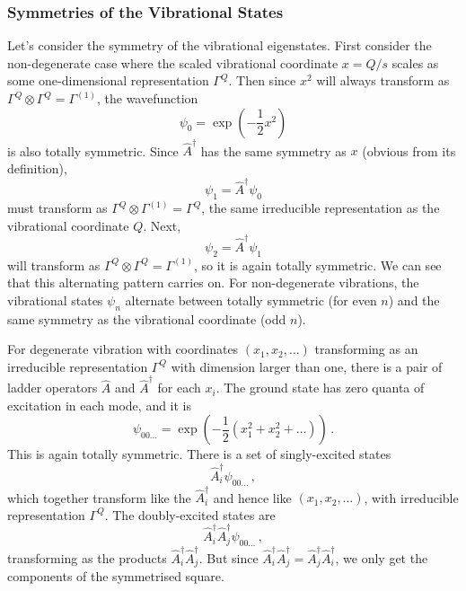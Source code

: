 \documentclass{article}
\theoremstyle{plain}\theoremheaderfont{\normalfont\itshape}\theorembodyfont{\rmfamily}\theoremseparator{.}\newtheorem*{rem}{Remark}\newtheorem*{ex}{Example}\newtheorem*{proof}{Proof}\newtheorem*{altp}{Alternative proof}
\theoremstyle{plain}\theoremheaderfont{\normalfont\bfseries}\theorembodyfont{\rmfamily}\theoremseparator{.}\newtheorem{thm}{Theorem}[section]\newtheorem{lem}[thm]{Lemma}\newtheorem{prop}[thm]{Proposition}\newtheorem*{cor}{Corollary}\newtheorem{defn}[thm]{Definition}\newtheorem{clm}[thm]{Claim}\newtheorem{clminproof}{Claim}\newtheorem*{law}{Law}\newtheorem{pos}[thm]{Postulate}
\theoremstyle{break}\theoremheaderfont{\normalfont\itshape}\theorembodyfont{\rmfamily}\theoremseparator{.\medskip}\newtheorem*{proofskip}{Proof}\newtheorem*{exs}{Examples}\newtheorem*{rems}{Remarks}
\theoremstyle{break}\theoremheaderfont{\normalfont\bfseries}\theorembodyfont{\rmfamily}\theoremseparator{.\medskip}\newtheorem{lemskip}[thm]{Lemma}\newtheorem{defnskip}[thm]{Definition}\newtheorem{propskip}[thm]{Proposition}\newtheorem{thmskip}[thm]{Theorem}
\numberwithin{equation}{section}
\begin{document}
    \subsubsection{Symmetries of the Vibrational States}
    Let's consider the symmetry of the vibrational eigenstates. First consider the non-degenerate case where the scaled vibrational coordinate \(x=Q/s\) scales as some one-dimensional representation \(\Gamma^Q\). Then since \(x^2\) will always transform as \(\Gamma^Q\otimes\Gamma^Q=\Gamma^{(1)}\), the wavefunction
    \begin{equation}
        \psi_0=\exp\left(-\frac{1}{2}x^2\right)
    \end{equation}
    is also totally symmetric. Since \(\hat{A}^\dagger\) has the same symmetry as \(x\) (obvious from its definition),
    \begin{equation}
        \psi_1=\hat{A}^\dagger\psi_0
    \end{equation}
    must transform as \(\Gamma^{Q}\otimes\Gamma^{(1)}=\Gamma^{Q}\), the same irreducible representation as the vibrational coordinate \(Q\). Next,
    \begin{equation}
        \psi_2=\hat{A}^\dagger\psi_1
    \end{equation}
    will transform as \(\Gamma^{Q}\otimes\Gamma^{Q}=\Gamma^{(1)}\), so it is again totally symmetric. We can see that this alternating pattern carries on. For non-degenerate vibrations, the vibrational states \(\psi_n\) alternate between totally symmetric (for even \(n\)) and the same symmetry as the vibrational coordinate (odd \(n\)).

    For degenerate vibration with coordinates \((x_1,x_2,\dots)\) transforming as an irreducible representation \(\Gamma^Q\) with dimension larger than one, there is a pair of ladder operators \(\hat{A}\) and \(\hat{A}^\dagger\) for each \(x_i\). The ground state has zero quanta of excitation in each mode, and it is
    \begin{equation}
        \psi_{00\dots}=\exp\left(-\frac{1}{2}(x_1^2+x_2^2+\dots)\right)\,.
    \end{equation}
    This is again totally symmetric. There is a set of singly-excited states
    \begin{equation}
        \hat{A}_i^\dagger\psi_{00\dots}\,,
    \end{equation}
    which together transform like the \(\hat{A}_i^\dagger\) and hence like \((x_1,x_2,\dots)\), with irreducible representation \(\Gamma^Q\). The doubly-excited states are
    \begin{equation}
        \hat{A}_i^\dagger\hat{A}_j^\dagger\psi_{00\dots}\,,
    \end{equation}
    transforming as the products \(\hat{A}_i^\dagger\hat{A}_j^\dagger\). But since \(\hat{A}_i^\dagger\hat{A}_j^\dagger=\hat{A}_j^\dagger\hat{A}_i^\dagger\), we only get the components of the symmetrised square.
\end{document}

